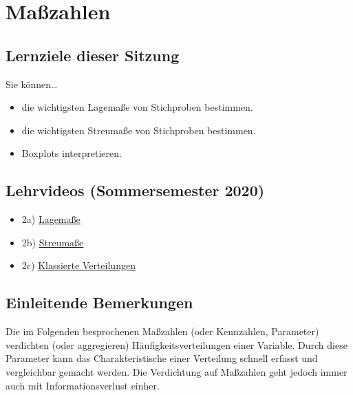 \documentclass[
  11pt,
  ngerman,
  a4paper,
]{report}
\providecommand{\tightlist}{%
  \setlength{\itemsep}{0pt}\setlength{\parskip}{0pt}}
\begin{document}
\hypertarget{mauxdfzahlen}{%
\chapter{Maßzahlen}\label{mauxdfzahlen}}

\hypertarget{lernziele-dieser-sitzung-1}{%
\section*{Lernziele dieser Sitzung}\label{lernziele-dieser-sitzung-1}}

Sie können\ldots{}

\begin{itemize}
\tightlist
\item
  die wichtigsten Lagemaße von Stichproben bestimmen.
\item
  die wichtigsten Streumaße von Stichproben bestimmen.
\item
  Boxplots interpretieren.
\end{itemize}

\hypertarget{lehrvideos-sommersemester-2020-1}{%
\section*{Lehrvideos (Sommersemester 2020)}\label{lehrvideos-sommersemester-2020-1}}

\begin{itemize}
\tightlist
\item
  2a) \href{https://video01.uni-frankfurt.de/Mediasite/Play/bbb30f8025cf48e99a48700b0600e1e11d}{Lagemaße}
\item
  2b) \href{https://video01.uni-frankfurt.de/Mediasite/Play/cfdb254c058f44228e7b026f36986cc31d}{Streumaße}
\item
  2c) \href{https://video01.uni-frankfurt.de/Mediasite/Play/d115769da4ee4e25a9062a9b2e2e11c41d}{Klassierte Verteilungen}
\end{itemize}

\hypertarget{einleitende-bemerkungen}{%
\section{Einleitende Bemerkungen}\label{einleitende-bemerkungen}}

Die im Folgenden besprochenen Maßzahlen (oder Kennzahlen, Parameter) verdichten (oder aggregieren) Häufigkeitsverteilungen einer Variable. Durch diese Parameter kann das Charakteristische einer Verteilung schnell erfasst und vergleichbar gemacht werden. Die Verdichtung auf Maßzahlen geht jedoch immer auch mit Informationsverlust einher.
\end{document}
